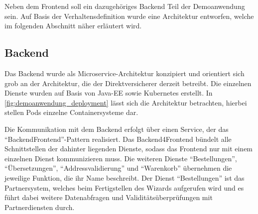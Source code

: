 









Neben dem Frontend soll ein dazugehöriges Backend Teil der Demoanwendung sein. Auf Basis der Verhaltensdefinition wurde eine Architektur entworfen, welche im folgenden Abschnitt näher erläutert wird.

\subsection{Backend}
\label{subsec:demoanwendung-backend}

Das Backend wurde als Microservice-Architektur \cite{MicroserviceArchitecture} konzipiert und orientiert sich grob an der Architektur, die der Direktversicherer derzeit betreibt. Die einzelnen Dienste wurden auf Basis von Java-EE sowie Kubernetes erstellt. In \autoref{fig:demoanwendung_deployment} lässt sich die Architektur betrachten, hierbei stellen Pods einzelne Containersysteme dar.

Die Kommunikation mit dem Backend erfolgt über einen Service, der das \enquote{Backend\-Frontend}-Pattern realisiert. Das Backend4Frontend bündelt alle Schnittstellen der dahinter liegenden Dienste, sodass das Frontend nur mit einem einzelnen Dienst kommunizieren muss. Die weiteren Dienste \enquote{Bestellungen}, \enquote{Übersetzungen}, \enquote{Addressvalidierung} und \enquote{Warenkorb} übernehmen die jeweilige Funktion, die ihr Name beschreibt. Der Dienst \enquote{Bestellungen} ist das Partnersystem, welches beim Fertigstellen des Wizards aufgerufen wird und es führt dabei weitere Datenabfragen und Validitätsüberprüfungen mit Partnerdiensten durch.

